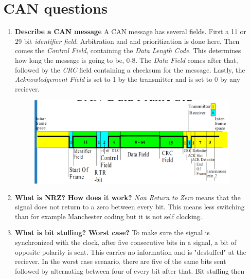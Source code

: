 \documentclass[10pt, a4paper]{article}
\begin{document}
\section{CAN questions}
\begin{enumerate}
    \item \textbf{Describe a CAN message} \newline
        A CAN message has several fields. First a 11 or 29 bit
        \textit{identifier field}. Arbitration and and prioritization is done
        here. Then comes the \textit{Control Field}, containing the
        \textit{Data Length Code}. This determines how long the message is going
        to be, 0-8. The \textit{Data Field} comes after that, followed by the
        \textit{CRC} field containing a checksum for the message. Lastly, the
        \textit{Acknowledgement Field} is set to 1 by the transmitter and is set
        to 0 by any reciever.
        \begin{figure}[H]
            \center
            \includegraphics[scale=0.3]{canmessage.png}
            \label{fig:canmessage}
        \end{figure}
    \item \textbf{What is NRZ? How does it work?}\newline
        \textit{Non Return to Zero} means that the signal does not return to a
        zero between every bit. This means less switching than for example
        Manchester coding but it is not self clocking. 
    \item \textbf{What is bit stuffing? Worst case?}\newline
        To make sure the signal is synchronized with the clock, after five
        consecutive bits in a signal, a bit of opposite polarity is sent. This
        carries no information and is "destuffed" at the reciever. In the worst
        case scenario, there are five of the same bits sent followed by
        alternating between four of every bit after that. Bit stuffing then

\end{enumerate}
\end{document}
